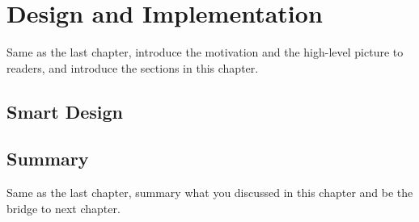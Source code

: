 \chapter{Design and Implementation}
\label{cha:design}
Same as the last chapter, introduce the motivation and the high-level picture to
readers, and introduce the sections in this chapter.


\section{Smart Design}
\label{sec:des-hotpath}

\section{Summary}
Same as the last chapter, summary what you discussed in this chapter and
be the bridge to next chapter.
